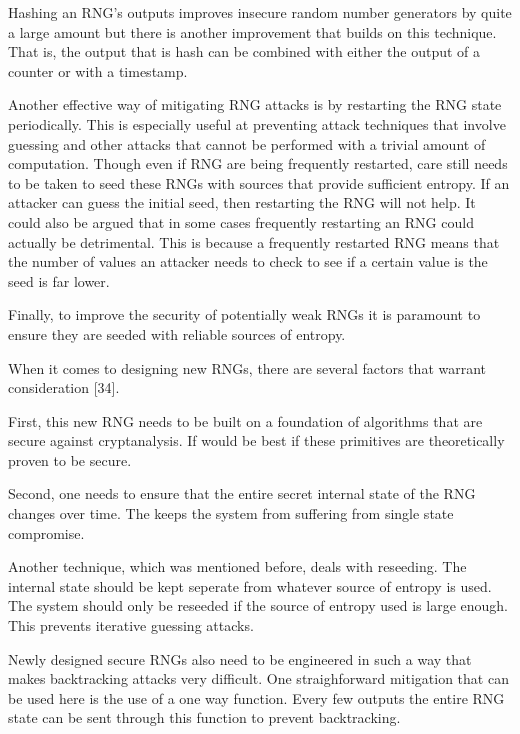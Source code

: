 \documentclass{article}
\begin{document}
    Hashing an RNG's outputs improves insecure random number generators by quite
    a large amount but there is another improvement that builds on this technique.
    That is, the output that is hash can be combined with either the output
    of a counter or with a timestamp.

    Another effective way of mitigating RNG attacks is by restarting
    the RNG state periodically. This is especially useful at preventing
    attack techniques that involve guessing and other attacks that cannot
    be performed with a trivial amount of computation.
    Though even if RNG are being frequently restarted, care still needs
    to be taken to seed these RNGs with sources that provide sufficient
    entropy. If an attacker can guess the initial seed, then restarting
    the RNG will not help.
    It could also be argued that in some cases frequently restarting
    an RNG could actually be detrimental.
    This is because a frequently restarted RNG means that the number
    of values an attacker needs to check to see if a certain value
    is the seed is far lower.

    Finally, to improve the security of potentially weak RNGs it is paramount
    to ensure they are seeded with reliable sources of entropy.

    When it comes to designing new RNGs, there are several factors
    that warrant consideration [34].

    First, this new RNG needs to be built on a foundation
    of algorithms that are secure against cryptanalysis.
    If would be best if these primitives are theoretically proven to be secure.

    Second, one needs to ensure that the entire secret internal state of the RNG
    changes over time.
    The keeps the system from suffering from single state compromise.

    Another technique, which was mentioned before, deals with reseeding.
    The internal state should be kept seperate from whatever source of entropy
    is used. The system should only be reseeded if the source of entropy used
    is large enough. This prevents iterative guessing attacks.

    Newly designed secure RNGs also need to be engineered in such a way that
    makes backtracking attacks very difficult.
    One straighforward mitigation that can be used here is the use of a
    one way function. Every few outputs the entire RNG state can be sent
    through this function to prevent backtracking.
\end{document}

